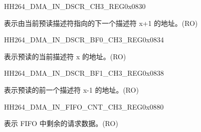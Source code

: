     
    \begin{register}{H}{H264\_DMA\_IN\_DSCR\_CH3\_REG}{0x0830}\label{regdesc:H264DMAINDSCRCH3REG}
    \regnewline%
    \begin{regdesc}\begin{reglist}
    \label{fielddesc:H264DMAINLINKDSCRCH3}\item [H264\_DMA\_INLINK\_DSCR\_CH3] 表示由当前预读描述符指向的下一个描述符 x+1 的地址。(RO)
    \end{reglist}\end{regdesc}
    \end{register}
    
    
    \begin{register}{H}{H264\_DMA\_IN\_DSCR\_BF0\_CH3\_REG}{0x0834}\label{regdesc:H264DMAINDSCRBF0CH3REG}
    \regnewline%
    \begin{regdesc}\begin{reglist}
    \label{fielddesc:H264DMAINLINKDSCRBF0CH3}\item [H264\_DMA\_INLINK\_DSCR\_BF0\_CH3] 表示预读的当前描述符 x 的地址。(RO)
    \end{reglist}\end{regdesc}
    \end{register}
    
    
    \begin{register}{H}{H264\_DMA\_IN\_DSCR\_BF1\_CH3\_REG}{0x0838}\label{regdesc:H264DMAINDSCRBF1CH3REG}
    \regnewline%
    \begin{regdesc}\begin{reglist}
    \label{fielddesc:H264DMAINLINKDSCRBF1CH3}\item [H264\_DMA\_INLINK\_DSCR\_BF1\_CH3] 表示预读的前一个描述符 x-1 的地址。(RO)
    \end{reglist}\end{regdesc}
    \end{register}
    
    \begin{register}{H}{H264\_DMA\_IN\_FIFO\_CNT\_CH3\_REG}{0x0880}\label{regdesc:H264DMAINFIFOCNTCH3REG}
    \regnewline%
    \begin{regdesc}\begin{reglist}
    \label{fielddesc:H264DMAINCMDFIFOINFIFOCNTCH3}\item [H264\_DMA\_IN\_CMDFIFO\_INFIFO\_CNT\_CH3] 表示 FIFO 中剩余的请求数据。(RO)
    \end{reglist}\end{regdesc}
    \end{register}
    
